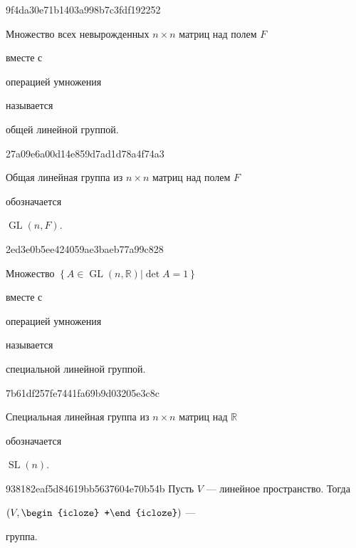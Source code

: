 \begin{note}{9f4da30e71b1403a998b7c3fdf192252}
    \begin{icloze}{2}Множество всех невырожденных \({ n \times n }\) матриц над полем \({ F }\)\end{icloze} вместе с \begin{icloze}{3}операцией умножения\end{icloze} называется \begin{icloze}{1}общей линейной группой.\end{icloze}
\end{note}

\begin{note}{27a09e6a00d14e859d7ad1d78a4f74a3}
    \begin{icloze}{2}Общая линейная группа из \({ n \times n }\) матриц над полем \({ F }\)\end{icloze} обозначается \begin{icloze}{1}\({ \operatorname{GL}(n, F) }\).\end{icloze}
\end{note}

\begin{note}{2ed3e0b5ee424059ae3baeb77a99c828}
    \begin{icloze}{2}Множество \({ \left\{ A \in \operatorname{GL}(n, \mathbb R) | \det A = 1 \right\} }\)\end{icloze} вместе с \begin{icloze}{3}операцией умножения\end{icloze} называется \begin{icloze}{1}специальной линейной группой.\end{icloze}
\end{note}

\begin{note}{7b61df257fe7441fa69b9d03205e3c8c}
    \begin{icloze}{2}Специальная линейная группа из \({ n \times n }\) матриц над \({ \mathbb R }\)\end{icloze} обозначается \begin{icloze}{1}\({ \operatorname{SL}(n) }\).\end{icloze}
\end{note}

\begin{note}{938182eaf5d84619bb5637604e70b54b}
    Пусть \({ V }\) --- линейное пространство.
    Тогда
    \begin{center}
        \({ (V, \begin{icloze}{1}+\end{icloze}) }\) --- \begin{icloze}{2}группа.\end{icloze}
    \end{center}
\end{note}

